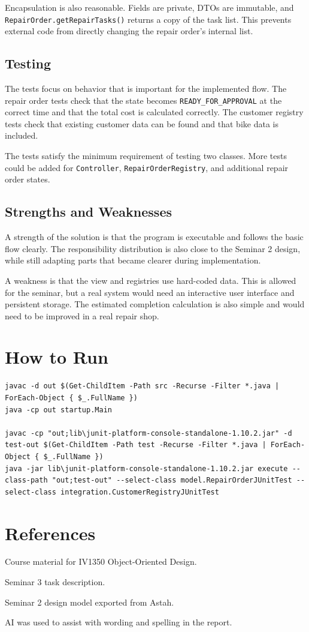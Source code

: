 \documentclass[12pt]{article}
\begin{document}
Encapsulation is also reasonable. Fields are private, DTOs are immutable, and \texttt{RepairOrder.getRepairTasks()} returns a copy of the task list. This prevents external code from directly changing the repair order's internal list.

\subsection{Testing}

The tests focus on behavior that is important for the implemented flow. The repair order tests check that the state becomes \texttt{READY\_FOR\_APPROVAL} at the correct time and that the total cost is calculated correctly. The customer registry tests check that existing customer data can be found and that bike data is included.

The tests satisfy the minimum requirement of testing two classes. More tests could be added for \texttt{Controller}, \texttt{RepairOrderRegistry}, and additional repair order states.

\subsection{Strengths and Weaknesses}

A strength of the solution is that the program is executable and follows the basic flow clearly. The responsibility distribution is also close to the Seminar 2 design, while still adapting parts that became clearer during implementation.

A weakness is that the view and registries use hard-coded data. This is allowed for the seminar, but a real system would need an interactive user interface and persistent storage. The estimated completion calculation is also simple and would need to be improved in a real repair shop.

\section{How to Run}

\begin{lstlisting}
javac -d out $(Get-ChildItem -Path src -Recurse -Filter *.java | ForEach-Object { $_.FullName })
java -cp out startup.Main

javac -cp "out;lib\junit-platform-console-standalone-1.10.2.jar" -d test-out $(Get-ChildItem -Path test -Recurse -Filter *.java | ForEach-Object { $_.FullName })
java -jar lib\junit-platform-console-standalone-1.10.2.jar execute --class-path "out;test-out" --select-class model.RepairOrderJUnitTest --select-class integration.CustomerRegistryJUnitTest
\end{lstlisting}

\section*{References}

Course material for IV1350 Object-Oriented Design.

Seminar 3 task description.

Seminar 2 design model exported from Astah.

AI was used to assist with wording and spelling in the report.
\end{document}
